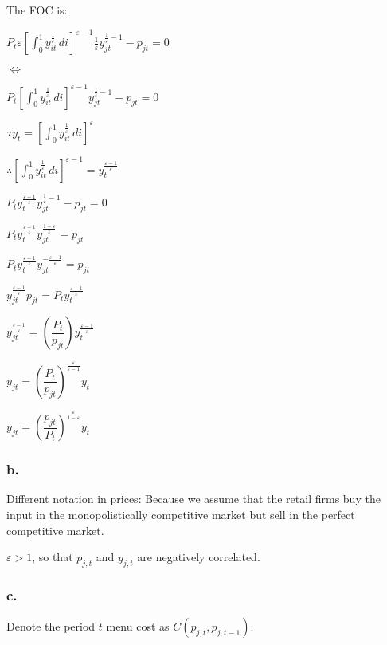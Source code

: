 \documentclass{article}
\begin{document}
The FOC is:

$\displaystyle P_{t}\varepsilon\left[\int_{0}^{1} y^{\frac{1}{\varepsilon}}_{it} \,di \right]^{\varepsilon-1}\frac{1}{\varepsilon}y^{\frac{1}{\varepsilon}-1}_{jt}-p_{jt}=0$

$\iff$

$P_{t}\left[\int_{0}^{1} y^{\frac{1}{\varepsilon}}_{it} \,di \right]^{\varepsilon-1}y^{\frac{1}{\varepsilon}-1}_{jt}-p_{jt}=0$

$\because y_{t}=\left[\int_{0}^{1} y^{\frac{1}{\varepsilon}}_{it} \,di \right]^{\varepsilon}$

$\therefore \left[\int_{0}^{1} y^{\frac{1}{\varepsilon}}_{it} \,di \right]^{\varepsilon-1}=y^{\frac{\varepsilon-1}{\varepsilon}}_{t}$

$P_{t}y^{\frac{\varepsilon-1}{\varepsilon}}_{t}y^{\frac{1}{\varepsilon}-1}_{jt}-p_{jt}=0$

$P_{t}y^{\frac{\varepsilon-1}{\varepsilon}}_{t}y^{\frac{1-\varepsilon}{\varepsilon}}_{jt}=p_{jt}$

$P_{t}y^{\frac{\varepsilon-1}{\varepsilon}}_{t}y^{-\frac{\varepsilon-1}{\varepsilon}}_{jt}=p_{jt}$

$y^{\frac{\varepsilon-1}{\varepsilon}}_{jt}p_{jt}=P_{t}y^{\frac{\varepsilon-1}{\varepsilon}}_{t}$

$y^{\frac{\varepsilon-1}{\varepsilon}}_{jt}=\left(\dfrac{P_{t}}{p_{jt}}\right)y^{\frac{\varepsilon-1}{\varepsilon}}_{t}$

$y_{jt}=\left(\dfrac{P_{t}}{p_{jt}}\right)^{\frac{\varepsilon}{\varepsilon-1}}y_{t}$

$y_{jt}=\left(\dfrac{p_{jt}}{P_{t}}\right)^{\frac{\varepsilon}{1-\varepsilon}}y_{t}$

\subsubsection*{b.}

Different notation in prices: Because we assume that the retail firms buy the input in the monopolistically competitive market but sell in the perfect competitive market. 

$\varepsilon>1$, so that $p_{j,t}$ and $y_{j,t}$ are negatively correlated.

\subsubsection*{c.}

Denote the period $t$ menu cost as $C\left(p_{j,t},p_{j,t-1}\right)$.
\end{document}
